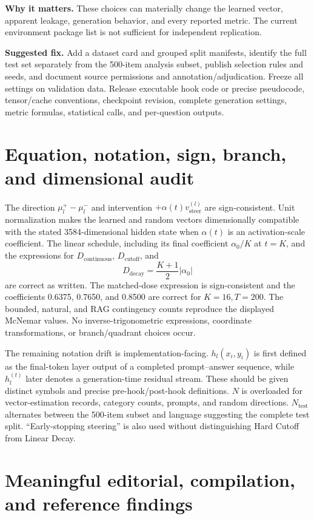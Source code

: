 \documentclass[11pt]{article}
\newcommand{\findinglabel}[1]{\textbf{#1}}
\begin{document}
\findinglabel{Why it matters.} These choices can materially change the learned vector, apparent leakage, generation behavior, and every reported metric.  The current environment package list is not sufficient for independent replication.

\findinglabel{Suggested fix.} Add a dataset card and grouped split manifests, identify the full test set separately from the 500-item analysis subset, publish selection rules and seeds, and document source permissions and annotation/adjudication.  Freeze all settings on validation data.  Release executable hook code or precise pseudocode, tensor/cache conventions, checkpoint revision, complete generation settings, metric formulas, statistical calls, and per-question outputs.

\section*{Equation, notation, sign, branch, and dimensional audit}

The direction $\mu_l^+-\mu_l^-$ and intervention $+\alpha(t)v_{\text{steer}}^{(l)}$ are sign-consistent.  Unit normalization makes the learned and random vectors dimensionally compatible with the stated 3584-dimensional hidden state when $\alpha(t)$ is an activation-scale coefficient.  The linear schedule, including its final coefficient $\alpha_0/K$ at $t=K$, and the expressions for $D_{\text{continuous}}$, $D_{\text{cutoff}}$, and
\[
D_{\text{decay}}=\frac{K+1}{2}|\alpha_0|
\]
are correct as written.  The matched-dose expression is sign-consistent and the coefficients 0.6375, 0.7650, and 0.8500 are correct for $K=16,T=200$.  The bounded, natural, and RAG contingency counts reproduce the displayed McNemar values.  No inverse-trigonometric expressions, coordinate transformations, or branch/quadrant choices occur.

The remaining notation drift is implementation-facing.  $h_l(x_i,y_i)$ is first defined as the final-token layer output of a completed prompt--answer sequence, while $h_l^{(t)}$ later denotes a generation-time residual stream.  These should be given distinct symbols and precise pre-hook/post-hook definitions.  $N$ is overloaded for vector-estimation records, category counts, prompts, and random directions.  $N_{\text{test}}$ alternates between the 500-item subset and language suggesting the complete test split.  ``Early-stopping steering'' is also used without distinguishing Hard Cutoff from Linear Decay.

\section*{Meaningful editorial, compilation, and reference findings}
\end{document}
